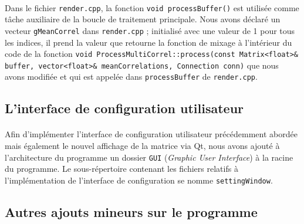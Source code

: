 \paragraph{}
Dans le fichier \verb!render.cpp!, la fonction
\verb!void processBuffer()! est utilisée comme tâche auxiliaire de la
boucle de traitement principale. Nous avons déclaré un vecteur
\verb!gMeanCorrel! dans \verb!render.cpp! ; initialisé avec une valeur
de 1 pour tous les indices, il prend la valeur que retourne la
fonction de mixage à l'intérieur du code de la fonction
\verb!void ProcessMultiCorrel::process(const Matrix<float>& buffer, vector<float>& meanCorrelations, Connection conn)!
que nous avons modifiée et qui est appelée dans \verb!processBuffer!
de \verb!render.cpp!.

\subsection{L'interface de configuration utilisateur}
\paragraph{}
Afin d'implémenter l'interface de configuration utilisateur
précédemment abordée mais également le nouvel affichage de la matrice
via Qt, nous avons ajouté à l'architecture du programme un dossier
\verb!GUI! (\textit{Graphic User Interface}) à la racine du
programme. Le sous-répertoire contenant les fichiers relatifs à
l'implémentation de l'interface de configuration se nomme
\verb!settingWindow!.
\paragraph{}

\subsection{Autres ajouts mineurs sur le programme}
